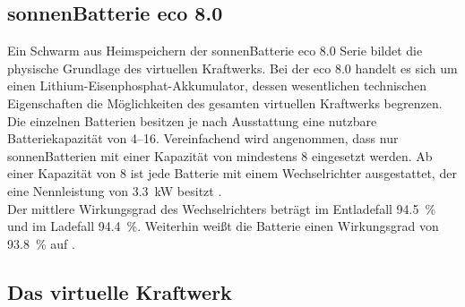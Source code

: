 \subsection{sonnenBatterie eco 8.0}\label{sec:SB_eco8_Theorie}

Ein Schwarm aus Heimspeichern der sonnenBatterie eco 8.0 Serie bildet die physische Grundlage des virtuellen Kraftwerks. Bei der eco 8.0 handelt es sich um einen Lithium-Eisenphosphat-Akkumulator, dessen wesentlichen technischen Eigenschaften die Möglichkeiten des gesamten virtuellen Kraftwerks begrenzen.\\
Die einzelnen Batterien besitzen je nach Ausstattung eine nutzbare Batteriekapazität von \SIrange{4}{16}{\kwh}. Vereinfachend wird angenommen, dass nur sonnenBatterien mit einer Kapazität von mindestens \SI{8}{\kwh} eingesetzt werden. Ab einer Kapazität von  \SI{8}{\kwh} ist jede Batterie  mit einem Wechselrichter ausgestattet, der eine Nennleistung von \SI{3.3}{\kilo\watt} besitzt \parencite{sonnenBat18}.\\
Der mittlere Wirkungsgrad des Wechselrichters beträgt im Entladefall \SI{94.5}{\percent} und im Ladefall \SI{94.4}{\percent}. Weiterhin weißt die Batterie einen Wirkungsgrad von \SI{93.8}{\percent} auf \parencite{htwInspek19}.

\subsection{Das virtuelle Kraftwerk}\label{sec:VK_Theorie}

